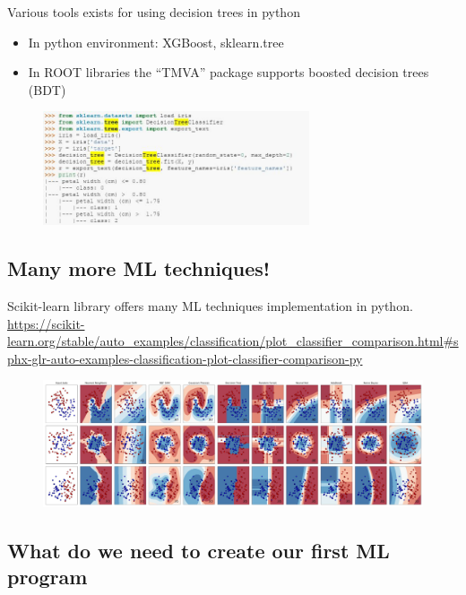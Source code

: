 Various tools exists for using decision trees in python\\
\begin{itemize}
	\item In python environment: XGBoost, sklearn.tree
	\item In ROOT libraries the “TMVA” package supports boosted decision trees (BDT)
\end{itemize}

\begin{figure}[ht]
	\centering
	\includegraphics[width=0.7\textwidth]{figure_ml/decision_trees_tools}
\end{figure}
\FloatBarrier

\subsection{Many more ML techniques!}

Scikit-learn library offers many ML techniques implementation in python.\\
\url{https://scikit-learn.org/stable/auto_examples/classification/plot_classifier_comparison.html#sphx-glr-auto-examples-classification-plot-classifier-comparison-py}

\begin{figure}[ht]
	\centering
	\includegraphics[width=1\textwidth]{figure_ml/scikit.png}
\end{figure}
\FloatBarrier

\subsection{What do we need to create our first ML program}

